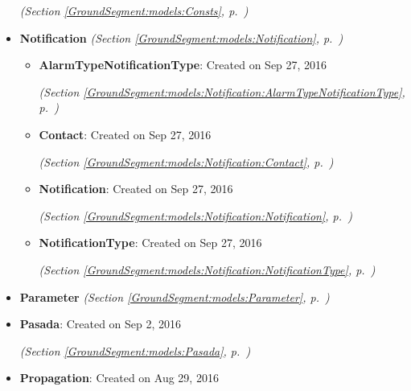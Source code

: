 \begin{itemize}
  \textit{(Section \ref{GroundSegment:models:Consts}, p.~\pageref{GroundSegment:models:Consts})}

\item \textbf{Notification}
  \textit{(Section \ref{GroundSegment:models:Notification}, p.~\pageref{GroundSegment:models:Notification})}

  \begin{itemize}
\setlength{\parskip}{0ex}
    \item \textbf{AlarmTypeNotificationType}: 
Created on Sep 27, 2016




  \textit{(Section \ref{GroundSegment:models:Notification:AlarmTypeNotificationType}, p.~\pageref{GroundSegment:models:Notification:AlarmTypeNotificationType})}

    \item \textbf{Contact}: 
Created on Sep 27, 2016




  \textit{(Section \ref{GroundSegment:models:Notification:Contact}, p.~\pageref{GroundSegment:models:Notification:Contact})}

    \item \textbf{Notification}: 
Created on Sep 27, 2016




  \textit{(Section \ref{GroundSegment:models:Notification:Notification}, p.~\pageref{GroundSegment:models:Notification:Notification})}

    \item \textbf{NotificationType}: 
Created on Sep 27, 2016




  \textit{(Section \ref{GroundSegment:models:Notification:NotificationType}, p.~\pageref{GroundSegment:models:Notification:NotificationType})}

  \end{itemize}
\item \textbf{Parameter}
  \textit{(Section \ref{GroundSegment:models:Parameter}, p.~\pageref{GroundSegment:models:Parameter})}

\item \textbf{Pasada}: 
Created on Sep 2, 2016




  \textit{(Section \ref{GroundSegment:models:Pasada}, p.~\pageref{GroundSegment:models:Pasada})}

\item \textbf{Propagation}: 
Created on Aug 29, 2016





\end{itemize}
